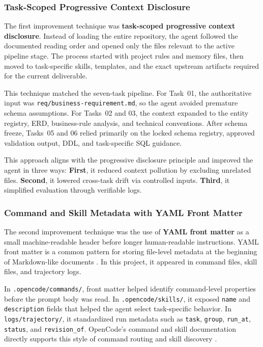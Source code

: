 \subsubsection{Task-Scoped Progressive Context Disclosure}
The first improvement technique was \textbf{task-scoped progressive context disclosure}. Instead of loading the entire repository, the agent followed the documented reading order and opened only the files relevant to the active pipeline stage. The process started with project rules and memory files, then moved to task-specific skills, templates, and the exact upstream artifacts required for the current deliverable.

This technique matched the seven-task pipeline. For Task~01, the authoritative input was \texttt{req/business-requirement.md}, so the agent avoided premature schema assumptions. For Tasks~02 and 03, the context expanded to the entity registry, ERD, business-rule analysis, and technical conventions. After schema freeze, Tasks~05 and 06 relied primarily on the locked schema registry, approved validation output, DDL, and task-specific SQL guidance.

This approach aligns with the progressive disclosure principle \cite{claudemem-progressive} and improved the agent in three ways: \textbf{First}, it reduced context pollution by excluding unrelated files. \textbf{Second}, it lowered cross-task drift via controlled inputs. \textbf{Third}, it simplified evaluation through verifiable logs.

\subsubsection{Command and Skill Metadata with YAML Front Matter}
The second improvement technique was the use of \textbf{YAML front matter} as a small machine-readable header before longer human-readable instructions. YAML front matter is a common pattern for storing file-level metadata at the beginning of Markdown-like documents \cite{jekyll-frontmatter}. In this project, it appeared in command files, skill files, and trajectory logs.

In \texttt{.opencode/commands/}, front matter helped identify command-level properties before the prompt body was read. In \texttt{.opencode/skills/}, it exposed \texttt{name} and \texttt{description} fields that helped the agent select task-specific behavior. In \texttt{logs/trajectory/}, it standardized run metadata such as \texttt{task}, \texttt{group}, \texttt{run\_at}, \texttt{status}, and \texttt{revision\_of}. OpenCode's command and skill documentation directly supports this style of command routing and skill discovery \cite{opencode-commands,opencode-skills}.

